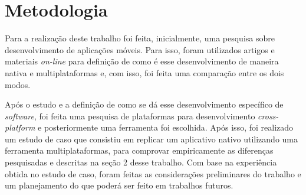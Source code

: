 \chapter{Metodologia} \label{cap:metodologia}
Para a realização deste trabalho foi feita, inicialmente, uma pesquisa sobre desenvolvimento de aplicações móveis. 
Para isso, foram utilizados artigos e materiais \textit{on-line} para definição de como é esse desenvolvimento
de maneira nativa e multiplataformas e, com isso, foi feita uma comparação entre os dois modos. 


Após o estudo e a definição de como se dá esse desenvolvimento específico de \textit{software},
foi feita uma pesquisa de plataformas para desenvolvimento \textit{cross-platform} e posteriormente uma ferramenta foi escolhida. Após isso, foi realizado um estudo de caso que
consistiu em replicar um aplicativo nativo utilizando uma ferramenta multiplataformas, para comprovar empiricamente as diferenças pesquisadas e descritas na seção 2 desse trabalho. 
Com base na experiência obtida no estudo de caso, foram feitas as considerações preliminares
do trabalho e um planejamento do que poderá ser feito em trabalhos futuros.

\begin{comment}
aqui eu trago o leitor pro nosso trabalho, ateh entao era coisas dos outros, aqui eu informo que meu trabalho vai ser esse

na introducao da metodologia, fazer esse resgate ao problema

qual a metodologia do estudo comparativo

em relacao ao que existe na literatura

estao discutindo isso

concluir dizendo o que vamos fazer de diferente, um estudo comparativo

dado isso nossa questao problema é: ....

NAO ESTAMOS VENDO A IMPORTANCIA DA RELACAO DA LINHA DE PRODUTO COM O CROSS PRO TCC 
ATEH ESTAMOS CORRELACIONAR, MAS EH MEIO FORCACAO DE BARRA
NAO FAZ PARTE DO FOCO DO NOSSO TRABALHO 
NAO SABEMOS COMO ABORDAR ESSE TEMA JA QUE NOSSA TEMA PARECE SER DIFERENTE DISSO
A UNICA FORMA DE ENCAIXAR LINHA DE PRODUTO NO TCC EH CRIAR UM SISTEMA PARA CRIACAO DE LINHA DE PRODUTOS DE APPS

\end{comment}

